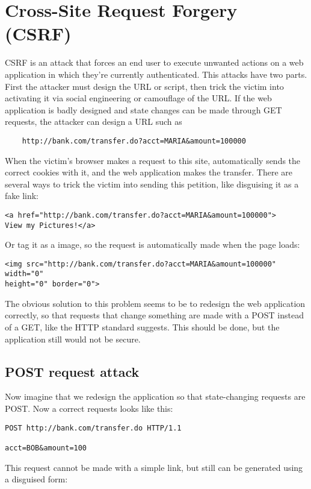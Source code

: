 \section{Cross-Site Request Forgery (CSRF)}
CSRF is an attack that forces an end user to execute unwanted actions on a web application in which they're currently authenticated. This attacks have two parts. First the attacker must design the URL or script, then trick the victim into activating it via social engineering or camouflage of the URL. If the web application is badly designed and state changes can be made through GET requests, the attacker can design a URL such as

\begin{verbatim}
	http://bank.com/transfer.do?acct=MARIA&amount=100000
\end{verbatim}
When the victim's browser makes a request to this site, automatically sends the correct cookies with it, and the web application makes the transfer. There are several ways to trick the victim into sending this petition, like disguising it as a fake link: 

\begin{verbatim}
<a href="http://bank.com/transfer.do?acct=MARIA&amount=100000">
View my Pictures!</a>
\end{verbatim}
Or tag it as a image, so the request is automatically made when the page loads:
\begin{verbatim}
<img src="http://bank.com/transfer.do?acct=MARIA&amount=100000" width="0" 
height="0" border="0">
\end{verbatim} 
The obvious solution to this problem seems to be to redesign the web application correctly, so that requests that change something are made with a POST instead of a GET, like the HTTP standard suggests. This should be done, but the application still would not be secure.

\subsection{POST request attack}
Now imagine that we redesign the application so that state-changing requests are POST. Now a correct requests looks like this:
\begin{verbatim}
POST http://bank.com/transfer.do HTTP/1.1

acct=BOB&amount=100
\end{verbatim}
This request cannot be made with a simple link, but still can be generated using a disguised form:

